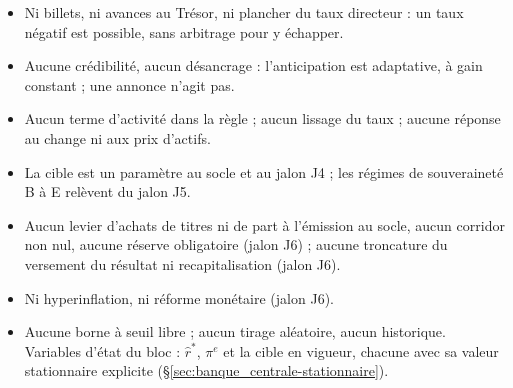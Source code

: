 \documentclass[11pt,a4paper]{article}
\begin{document}
\begin{portee}
\begin{itemize}
\item Ni billets, ni avances au Trésor, ni plancher du taux directeur : un taux négatif est possible, sans arbitrage pour y échapper.
\item Aucune crédibilité, aucun désancrage : l'anticipation est adaptative, à gain constant ; une annonce n'agit pas.
\item Aucun terme d'activité dans la règle ; aucun lissage du taux ; aucune réponse au change ni aux prix d'actifs.
\item La cible est un paramètre au socle et au jalon J4 ; les régimes de souveraineté B à E relèvent du jalon J5.
\item Aucun levier d'achats de titres ni de part à l'émission au socle, aucun corridor non nul, aucune réserve obligatoire (jalon J6) ; aucune troncature du versement du résultat ni recapitalisation (jalon J6).
\item Ni hyperinflation, ni réforme monétaire (jalon J6).
\item Aucune borne à seuil libre ; aucun tirage aléatoire, aucun historique. Variables d'état du bloc : $\hat r^\ast$, $\pi^e$ et la cible en vigueur, chacune avec sa valeur stationnaire explicite (\S\ref{sec:banque_centrale-stationnaire}).
\end{itemize}
\end{portee}

\end{document}

